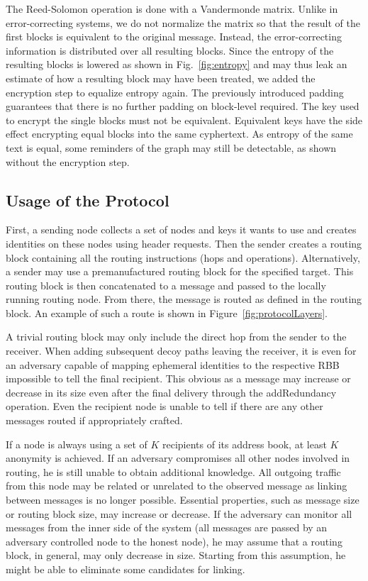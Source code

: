 \documentclass[acmsmall, screen, final, natbib=false]{acmart}
\begin{document}
	
	The Reed-Solomon operation is done with a Vandermonde matrix. Unlike in error-correcting systems, we do not normalize the matrix so that the result of the first blocks is equivalent to the original message. Instead, the error-correcting information is distributed over all resulting blocks. Since the entropy of the resulting blocks is lowered as shown in Fig.~\ref{fig:entropy} and may thus leak an estimate of how a resulting block may have been treated, we added the encryption step to equalize entropy again. The previously introduced padding guarantees that there is no further padding on block-level required. The key used to encrypt the single blocks must not be equivalent. Equivalent keys have the side effect encrypting equal blocks into the same cyphertext. As entropy of the same text is equal, some reminders of the graph may still be detectable, as shown without the encryption step.
	
	\subsection{Usage of the Protocol}
	First, a sending node collects a set of nodes and keys it wants to use and creates identities on these nodes using header requests. Then the sender creates a routing block containing all the routing instructions (hops and operations). Alternatively, a sender may use a premanufactured routing block for the specified target. This routing block is then concatenated to a message and passed to the locally running routing node. From there, the message is routed as defined in the routing block. An example of such a route is shown in Figure~\ref{fig:protocolLayers}.
	
	A trivial routing block may only include the direct hop from the sender to the receiver. When adding subsequent decoy paths leaving the receiver, it is even for an adversary capable of mapping ephemeral identities to the respective RBB impossible to tell the final recipient. This obvious as a message may increase or decrease in its size even after the final delivery through the addRedundancy operation. Even the recipient node is unable to tell if there are any other messages routed if appropriately crafted.
	
	If a node is always using a set of $K$ recipients of its address book, at least $K$ anonymity is achieved. If an adversary compromises all other nodes involved in routing, he is still unable to obtain additional knowledge. All outgoing traffic from this node may be related or unrelated to the observed message as linking between messages is no longer possible. Essential properties, such as message size or routing block size, may increase or decrease. If the adversary can monitor all messages from the inner side of the system (all messages are passed by an adversary controlled node to the honest node), he may assume that a routing block, in general, may only decrease in size. Starting from this assumption, he might be able to eliminate some candidates for linking.
	
\end{document}
